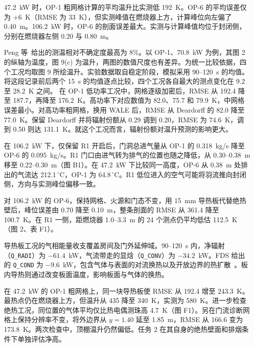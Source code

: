 47.2~kW 时，OP-1 粗网格计算的平均温升比实测低 192~K。OP-6 的平均误差仅为 $+6$~K（RMSE 为 33~K），但实测峰值在燃烧器上方，计算峰位向左偏了 0.40~m。106.2~kW 时，OP-6 的剖面误差最大。实测与计算峰值均位于封闭侧，分别在燃烧器左侧 0.20 与 0.80~m。

Peng 等~\cite{peng}给出的测温相对不确定度最高为 8\%。以 OP-1、70.8~kW 为例，其图 2 的纵轴为温度，图 9(c) 为温升，两图的数值尺度也有差异。为统一比较依据，四个工况均取图 9 所绘温升。实验数据取自稳定阶段，模拟采用 90--120~s 的均值。将这段记录前后两个 15~s 的均值逐点比较，四个工况各自最大的测点变化在 9.2 至 28.2~K 之间。
在 OP-1 低功率工况中，网格逐级加密后，RMSE 从 192.4 降至 187.7，再降至 176.2~K。高功率下对应数值为 82.0、75.7 和 79.9~K，中网格误差最小。对高功率粗网格，换用 WALE 后，RMSE 从 Deardorff 的 82.0 降至 77.0~K。保留 Deardorff 并将辐射份额从 0.29 调到 0.20，RMSE 为 74.6~K，调到 0.50 则达 131.1~K。就这个工况而言，辐射份额对温升预测的影响更大。

\clearpage
{}
在 106.2~kW 下，仅保留 R1 开启后，门洞总进气量从 OP-1 的 0.318~kg/s 降至 OP-6 的 0.095~kg/s。R1 门口由进气转为排气的位置也随之降低，从 0.30--0.38~m 移至 0.22--0.30~m（图 B1）。在 47.2~kW 下比较同一高度，OP-6 从 0.38~m 处排出的气流达 212.1$\,^{\circ}$C，OP-1 为 64.8$\,^{\circ}$C。R1 低位进入的空气可能将羽流推向封闭侧，方向与实测峰位偏移一致。

对 106.2~kW 的 OP-6，保持网格、火源和门态不变，用 15~mm 导热板代替绝热壁后，峰位误差由 0.70 降至 0.10~m，整条剖面的 RMSE 从 361.4 降至 100.7~K。在 R1 一侧，距燃烧器 1.0--3.3~m 的 24 个测点仍平均低估 112.5~K（图 2、表 F1）。

导热板工况的气相能量收支覆盖房间及门外延伸域。90--120~s 内，净辐射（\texttt{Q\_RADI}）为 $-61.4$~kW，气流带走的显焓（\texttt{Q\_CONV}）为 $-34.2$~kW。FDS 给出的 \texttt{Q\_COND} 为 $-9.6$~kW，包含气体与表面的对流换热以及开放边界的热扩散~\cite{fdsuser}。板内导热则通过改变板面温度，影响板面与气体的换热。

在 47.2~kW 的 OP-1 粗网格上，同一块导热板使 RMSE 从 192.4 增至 243.3~K。最热点仍在燃烧器上方，但温升从 435 降至 340~K，实测为 580~K。进一步检查绝热工况，同位置的气体平均仅比热电偶测珠高 4.7~K（图 F1）。另在门流诊断网格上保持分辨率不变，将外边界从 $y=1.40$ 延至 1.85~m，RMSE 从 166.6 变为 173.8~K。两次检查中，顶棚温升仍然偏低。任务 2 在其自身的绝热壁面和排烟条件下单独评估净高。
